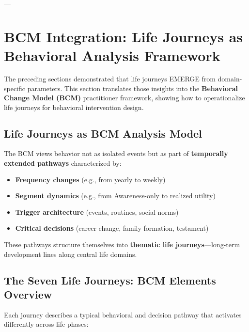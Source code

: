 {{{---


\section{BCM Integration: Life Journeys as Behavioral Analysis Framework}
\label{sec:bcm-integration}

The preceding sections demonstrated that life journeys EMERGE from domain-specific parameters. This section translates those insights into the \textbf{Behavioral Change Model (BCM)} practitioner framework, showing how to operationalize life journeys for behavioral intervention design.

\subsection{Life Journeys as BCM Analysis Model}

The BCM views behavior not as isolated events but as part of \textbf{temporally extended pathways} characterized by:

\begin{itemize}[nosep]
\item \textbf{Frequency changes} (e.g., from yearly to weekly)
\item \textbf{Segment dynamics} (e.g., from Awareness-only to realized utility)
\item \textbf{Trigger architecture} (events, routines, social norms)
\item \textbf{Critical decisions} (career change, family formation, testament)
\end{itemize}

These pathways structure themselves into \textbf{thematic life journeys}---long-term development lines along central life domains.

\subsection{The Seven Life Journeys: BCM Elements Overview}

Each journey describes a typical behavioral and decision pathway that activates differently across life phases:

}}}
